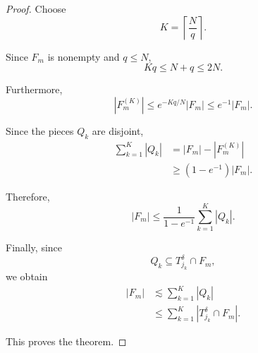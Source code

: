 \documentclass[11pt, letterpaper]{nyjm}
\begin{document}
\begin{proof}
		Choose
		\[
		K=\left\lceil\frac Nq\right\rceil.
		\]
		
		Since $F_m$ is nonempty and $q\leq N$,
		\[
		Kq\leq N+q\leq 2N.
		\]
		
		Furthermore,
		\[
		|F_m^{(K)}|
		\leq e^{-Kq/N}|F_m|
		\leq e^{-1}|F_m|.
		\]
		
		Since the pieces $Q_k$ are disjoint,
		\[
		\begin{aligned}
			\sum_{k=1}^K|Q_k|
			&=
			|F_m|-|F_m^{(K)}|\\
			&\geq
			(1-e^{-1})|F_m|.
		\end{aligned}
		\]
		
		Therefore,
		\[
		\boxed{
			|F_m|
			\leq
			\frac{1}{1-e^{-1}}
			\sum_{k=1}^K|Q_k|.
		}
		\]
		
		Finally, since
		\[
		Q_k\subseteq T_{j_k}^\delta\cap F_m,
		\]
		we obtain
		\[
		\begin{aligned}
			|F_m|
			&\lesssim\sum_{k=1}^K|Q_k|\\
			&\leq
			\sum_{k=1}^K
			|T_{j_k}^\delta\cap F_m|.
		\end{aligned}
		\]
		
		This proves the theorem.
	\end{proof}
	
\end{document}
